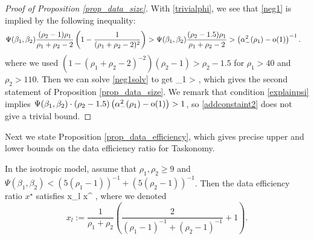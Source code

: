 \begin{proof}[Proof of Proposition \ref{prop_data_size}]
With \eqref{trivialphi}, we see that \eqref{neg1} is implied by the following inequality:
\begin{align}\label{neg1solv}
 & \Psi(\beta_1,\beta_2)  \frac{(\rho_2-1) \rho_1 }{\rho_1+\rho_2-2}\left( 1-\frac{1}{(\rho_1+\rho_2-2)^2}\right) >  \Psi(\beta_1,\beta_2) \frac{(\rho_2-1.5) \rho_1 }{\rho_1+\rho_2-2}> \left( \alpha_-^2(\rho_1) -  \operatorname{o}(1) \right)^{-1} .
 \end{align}
 where we used $(1-(\rho_1+\rho_2-2)^{-2})(\rho_2 - 1) > \rho_2-1.5$ for $\rho_1>40$ and $\rho_2>110$. Then we can solve \eqref{neg1solv} to get
 \be\label{addconstaint2}
 \rho_1 >   ,
 \ee
which gives the second statement of Proposition \ref{prop_data_size}.
We remark that condition \eqref{explainpsi} implies $\Psi(\beta_1, \beta_2) \cdot  (\rho_2 - 1.5)\left( \alpha_-^2(\rho_1) -  \operatorname{o}(1) \right)>1$, so \eqref{addconstaint2} does not give a trivial bound. 
 \end{proof}
 
Next we state Proposition \ref{prop_data_efficiency}, which gives precise upper and lower bounds on the data efficiency ratio for Taskonomy. %

\begin{proposition}%
\label{prop_data_efficiency}
	In the isotropic model, assume that $\rho_1,\rho_2 \ge 9$ and $\Psi(\beta_1, \beta_2) < (5(\rho_1-1))^{-1} + (5(\rho_2-1))^{-1}$.
	Then the data efficiency ratio $x^\star$ satisfies 
	\be\label{eq_uplowx} x_l  \le x^\star\le {} , \ee
	where we denoted
	$$x_l:= \frac1{\rho_1+\rho_2}\left(\frac{2}{(\rho_1-1)^{-1}+(\rho_2 -1)^{-1}}+1\right).$$
\end{proposition}


